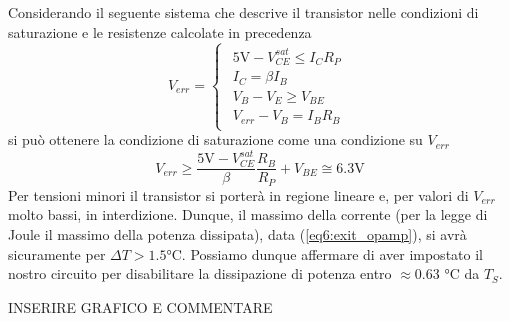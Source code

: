 Considerando il seguente sistema che descrive il transistor nelle condizioni di saturazione e le resistenze calcolate in precedenza
$$
V_{err} = \begin{cases}
\begin{array}{rl}
5\si{\volt}-V_{CE}^{sat} \leq I_{C}R_P\\
I_C=\beta I_B \\
V_B - V_E \geq V_{BE}\\
V_{err}-V_B=I_B R_B
\end{array}
\end{cases}
$$
si può ottenere la condizione di saturazione come una condizione su $V_{err}$
$$V_{err}\geq \frac{5\si{\volt}-V_{CE}^{sat}}{\beta} \frac{R_B}{R_P}+V_{BE} \cong 6.3 \si{\volt}$$
Per tensioni minori il transistor si porterà in regione lineare e, per valori di $V_{err}$ molto bassi, in interdizione. Dunque, il massimo della corrente (per la legge di Joule il massimo della potenza dissipata), data (\ref{eq6:exit_opamp}), si avrà sicuramente per $\Delta T > 1.5 \si{\celsius}$.
Possiamo dunque affermare di aver impostato il nostro circuito per disabilitare la dissipazione di potenza entro $\approx 0.63$ \si{\celsius} da $T_{S}$.

INSERIRE GRAFICO E COMMENTARE

